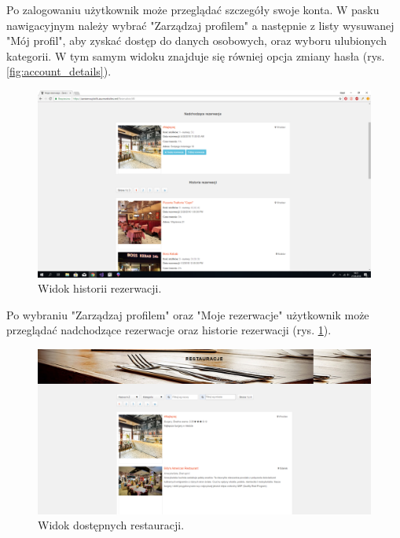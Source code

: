 \documentclass{article}
\begin{document}
Po zalogowaniu użytkownik może przeglądać szczegóły swoje konta. W pasku nawigacyjnym należy wybrać "Zarządzaj profilem" a następnie z listy wysuwanej "Mój profil", aby zyskać dostęp do danych osobowych, oraz wyboru ulubionych kategorii. W tym samym widoku znajduje się równiej opcja zmiany hasła (rys. \ref{fig:account_details}).

\begin{figure}[H]
\centering
	\includegraphics[width=1.00\textwidth]{screens/reservations_history.png}
	\caption[caption]{Widok historii rezerwacji.}
	\label{fig:account_reservations_history}
\end{figure}

Po wybraniu "Zarządzaj profilem" oraz "Moje rezerwacje" użytkownik może przeglądać nadchodzące rezerwacje oraz historie rezerwacji (rys. \ref{fig:account_reservations_history}).

\begin{figure}[H]
\centering
	\includegraphics[width=1.00\textwidth]{screens/restaurants.png}
	\caption[caption]{Widok dostępnych restauracji.}
	\label{fig:restaurants}
\end{figure}
\end{document}
